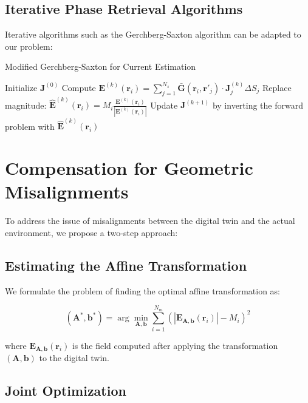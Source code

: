 \documentclass[12pt,a4paper]{article}
\begin{document}
\subsection{Iterative Phase Retrieval Algorithms}

Iterative algorithms such as the Gerchberg-Saxton algorithm can be adapted to our problem:

\begin{algorithm}
\caption{Modified Gerchberg-Saxton for Current Estimation}
\begin{algorithmic}[1]
\State Initialize $\mathbf{J}^{(0)}$
    \State Compute $\mathbf{E}^{(k)}(\mathbf{r}_i) = \sum_{j=1}^{N_s} \bar{\mathbf{G}}(\mathbf{r}_i, \mathbf{r}'_j) \cdot \mathbf{J}^{(k)}_j \Delta S_j$
    \State Replace magnitude: $\hat{\mathbf{E}}^{(k)}(\mathbf{r}_i) = M_i \frac{\mathbf{E}^{(k)}(\mathbf{r}_i)}{|\mathbf{E}^{(k)}(\mathbf{r}_i)|}$
    \State Update $\mathbf{J}^{(k+1)}$ by inverting the forward problem with $\hat{\mathbf{E}}^{(k)}(\mathbf{r}_i)$
\EndFor
\end{algorithmic}
\end{algorithm}

\section{Compensation for Geometric Misalignments}

To address the issue of misalignments between the digital twin and the actual environment, we propose a two-step approach:

\subsection{Estimating the Affine Transformation}

We formulate the problem of finding the optimal affine transformation as:

\begin{equation}
    (\mathbf{A}^*, \mathbf{b}^*) = \arg\min_{\mathbf{A}, \mathbf{b}} \sum_{i=1}^{N_m} \left( |\mathbf{E}_{\mathbf{A}, \mathbf{b}}(\mathbf{r}_i)| - M_i \right)^2
\end{equation}

where $\mathbf{E}_{\mathbf{A}, \mathbf{b}}(\mathbf{r}_i)$ is the field computed after applying the transformation $(\mathbf{A}, \mathbf{b})$ to the digital twin.

\subsection{Joint Optimization}
\end{document}
